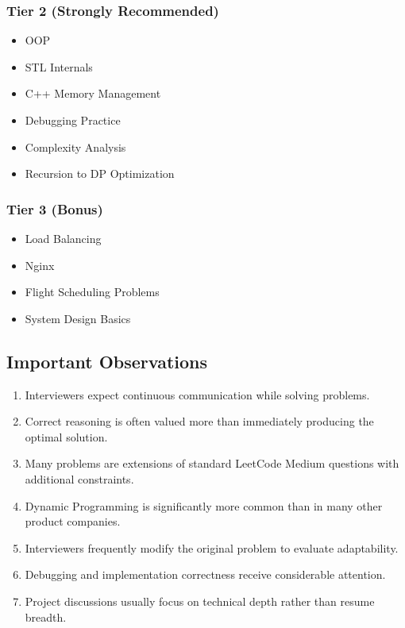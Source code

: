 \documentclass[11pt,a4paper]{article}
\begin{document}
\subsubsection{Tier 2 (Strongly Recommended)}

\begin{itemize}
	\item OOP
	\item STL Internals
	\item C++ Memory Management
	\item Debugging Practice
	\item Complexity Analysis
	\item Recursion to DP Optimization
\end{itemize}

\subsubsection{Tier 3 (Bonus)}

\begin{itemize}
	\item Load Balancing
	\item Nginx
	\item Flight Scheduling Problems
	\item System Design Basics
\end{itemize}


\subsection{Important Observations}

\begin{enumerate}
	\item Interviewers expect continuous communication while solving problems.
	\item Correct reasoning is often valued more than immediately producing the optimal solution.
	\item Many problems are extensions of standard LeetCode Medium questions with additional constraints.
	\item Dynamic Programming is significantly more common than in many other product companies.
	\item Interviewers frequently modify the original problem to evaluate adaptability.
	\item Debugging and implementation correctness receive considerable attention.
	\item Project discussions usually focus on technical depth rather than resume breadth.
\end{enumerate}
\end{document}

